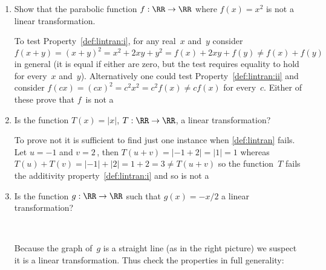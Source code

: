 \begin{example}[1D cases] 
\begin{enumerate}
\item Show that the parabolic function \(f:\RR\to\RR\) where \(f(x)=x^2\) is not a linear transformation.
\begin{solution} 
To test Property~\ref{def:lintran:i},  for any real~\(x\) and~\(y\) consider \(f(x+y)=(x+y)^2=x^2+2xy+y^2=f(x)+2xy+f(y)\neq f(x)+f(y)\) in general (it is equal if either are zero, but the test requires equality to hold for every~\(x\) and~\(y\)).  
Alternatively one could test Property~\ref{def:lintran:ii} and consider \(f(cx)=(cx)^2=c^2x^2=c^2f(x)\neq cf(x)\) for every~\(c\).
Either of these prove that \(f\)~is not a 
\end{solution}

\item 
\begin{figbox}{}
Is the function \(T(x)=|x|\), \(T:\RR\to\RR\), a linear transformation? 
\vspace{2.5\baselineskip}
\end{figbox}

\begin{solution} 
To prove not it is sufficient to find just one instance when \cref{def:lintran} fails. 
Let \(u=-1\) and \(v=2\)\,, then \(T(u+v)=|-1+2|=|1|=1\) whereas \(T(u)+T(v)=|-1|+|2|=1+2=3\neq T(u+v)\) so the function~\(T\) fails the additivity property~\cref{def:lintran:i} and so is not a 
\end{solution}



\item 
Is the function \(g:\RR\to\RR\) such that \(g(x)=-x/2\) a linear transformation?

\begin{solution} \ \\
\begin{figbox}{}
Because the graph of~\(g\) is a straight line (as in the right picture) we suspect it is a linear transformation.
Thus check the properties in full generality:
\vspace{2ex}


\end{figbox}
\end{solution}
\end{enumerate}
\end{example}
